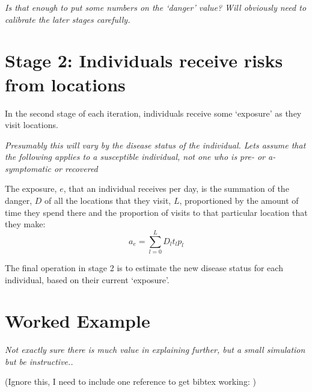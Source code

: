 \documentclass{article}
\begin{document}
\textit{Is that enough to put some numbers on the `danger' value? Will obviously need to calibrate the later stages carefully.}

\section{Stage 2: Individuals receive risks from locations}

In the second stage of each iteration, individuals receive some `exposure' as they visit locations.

\textit{Presumably this will vary by the disease status of the individual. Lets assume that the following applies to a susceptible individual, not one who is pre- or a-symptomatic or recovered}

The exposure, $e$, that an individual receives per day, is the summation of the danger, $D$ of all the locations that they visit, $L$, proportioned by the amount of time they spend there and the proportion of visits to that particular location that they make:
\begin{equation}
  a_e = \sum_{l=0}^{L} D_l t_l p_l 
\end{equation}

The final operation in stage 2 is to estimate the new disease status for each individual, based on their current `exposure'.

\section{Worked Example}

\textit{Not exactly sure there is much value in explaining further, but a small simulation but be instructive..}



\newpage
(Ignore this, I need to include one reference to get bibtex working: \cite{hellewell_feasibility_2020})



\end{document}
